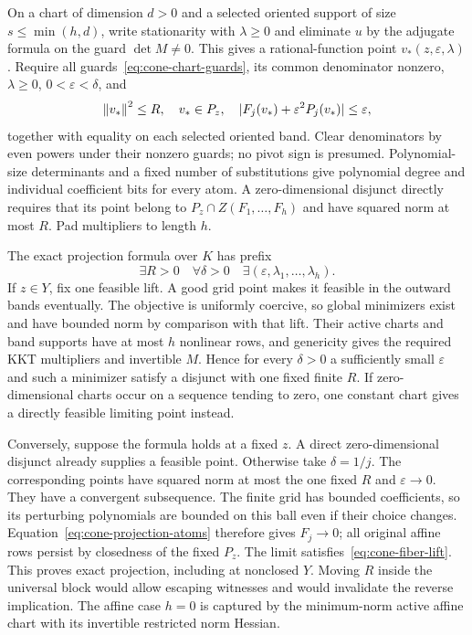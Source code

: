 On a chart of dimension $d>0$ and a selected oriented support of size
$s\le\min(h,d)$, write stationarity with $\lambda\ge0$ and eliminate
$u$ by the adjugate formula on the guard $\det M\ne0$. This gives a
rational-function point $v_*(z,\varepsilon,\lambda)$. Require all
guards~\eqref{eq:cone-chart-guards}, its common denominator nonzero,
$\lambda\ge0$, $0<\varepsilon<\delta$, and
\begin{equation}
\label{eq:cone-projection-atoms}
 \left\lVert v_*\right\rVert^2\le R,\quad v_*\in P_z,\quad
 |F_j(v_*)+\varepsilon^2P_j(v_*)|\le\varepsilon,
\end{equation}
together with equality on each selected oriented band. Clear denominators
by even powers under their nonzero guards; no pivot sign is presumed.
Polynomial-size determinants and a fixed number of substitutions give
polynomial degree and individual coefficient bits for every atom.
A zero-dimensional disjunct directly requires that its point belong to
$P_z\cap Z(F_1,\ldots,F_h)$ and have squared norm at most $R$.
Pad multipliers to length $h$.

The exact projection formula over $K$ has prefix
\begin{equation}
\label{eq:cone-projection-prefix}
 \exists R>0\quad\forall\delta>0\quad
       \exists(\varepsilon,\lambda_1,\ldots,\lambda_h).
\end{equation}
If $z\in Y$, fix one feasible lift. A good grid point makes it feasible
in the outward bands eventually. The objective is uniformly coercive,
so global minimizers exist and have bounded norm by comparison with that
lift. Their active charts and band supports have at most $h$ nonlinear
rows, and genericity gives the required KKT multipliers and invertible
$M$. Hence for every $\delta>0$ a sufficiently small $\varepsilon$
and such a minimizer satisfy a disjunct with one fixed finite $R$.
If zero-dimensional charts occur on a sequence tending to zero, one
constant chart gives a directly feasible limiting point instead.

Conversely, suppose the formula holds at a fixed $z$. A direct
zero-dimensional disjunct already supplies a feasible point. Otherwise
take $\delta=1/j$. The corresponding points have squared norm at most
the one fixed $R$ and $\varepsilon\to0$. They have a convergent
subsequence. The finite grid has bounded coefficients, so its perturbing
polynomials are bounded on this ball even if their choice changes.
Equation~\eqref{eq:cone-projection-atoms} therefore gives $F_j\to0$;
all original affine rows persist by closedness of the fixed $P_z$. The
limit satisfies~\eqref{eq:cone-fiber-lift}. This proves exact projection,
including at nonclosed $Y$. Moving $R$ inside the universal block would
allow escaping witnesses and would invalidate the reverse implication.
The affine case $h=0$ is captured by the minimum-norm active affine
chart with its invertible restricted norm Hessian.

